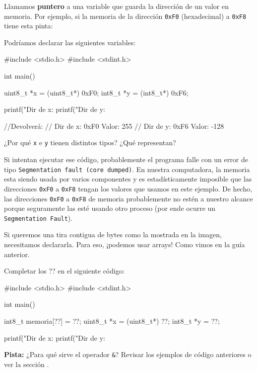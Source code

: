 \documentclass[]{scrartcl}
\begin{document}
Llamamos \textbf{puntero} a una variable que guarda la dirección de un valor en memoria. Por ejemplo, si la memoria de la dirección \texttt{0xF0} (hexadecimal) a \texttt{0xF8} tiene esta pinta:
%
\begin{center}
  \noindent {}
  \label{fig:tira-memoria}
\end{center}
%
Podríamos declarar las siguientes variables:
\begin{cbox}[unbreakable]{}
  #include <stdio.h>
  #include <stdint.h>

  int main(){
    uint8_t *x = (uint8_t*) 0xF0;
    int8_t *y = (int8_t*) 0xF6;

    printf("Dir de x: %
    printf("Dir de y: %

    //Devolverá:
    //  Dir de x: 0xF0 Valor: 255
    //  Dir de y: 0xF6 Valor: -128
  }
\end{cbox}

\begin{exbox}[label=ejercicio3]
  ¿Por qué \texttt{x} e \texttt{y} tienen distintos tipos? ¿Qué representan?
\end{exbox}

Si intentan ejecutar ese código, probablemente el programa falle con un error de tipo \texttt{Segmentation fault (core dumped)}.
En nuestra computadora, la memoria esta siendo usada por varios componentes y es estadísticamente imposible que las direcciones \texttt{0xF0} a \texttt{0xF8} tengan los valores que usamos en este ejemplo.
De hecho, las direcciones \texttt{0xF0} a \texttt{0xF8} de memoria probablemente no estén a nuestro alcance porque seguramente las esté usando otro proceso (por ende ocurre un \texttt{Segmentation Fault}).

Si queremos una tira contigua de bytes como la mostrada en la imagen, necesitamos declararla.
Para eso, ¡podemos usar arrays! Como vimos en la guía anterior.

\begin{exbox}[label=ejercicio4]
  Completar los ?? en el siguiente código:

  \begin{cbox}[unbreakable]{}
    #include <stdio.h>
    #include <stdint.h>

    int main(){
        int8_t memoria[??] = ??;
        uint8_t *x = (uint8_t*) ??;
        int8_t *y = ??;

        printf("Dir de x: %
        printf("Dir de y: %
    }
  \end{cbox}

  \textbf{Pista:} ¿Para qué sirve el operador \texttt{\&}? Revisar los ejemplos de código anteriores o ver la sección .
\end{exbox}
\end{document}
